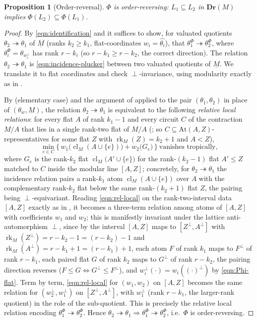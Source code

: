 \documentclass{article}
\newtheorem{proposition}[theorem]{Proposition}
\theoremstyle{definition}
\newcommand{\rk}{\operatorname{rk}}
\newcommand{\cl}{\operatorname{cl}}
\newcommand{\onto}{\twoheadrightarrow}
\newcommand{\Dr}{\mathbf{Dr}}
\begin{document}
\begin{proposition}[Order-reversal]\label{prop:rev}
$\Phi$ is order-reversing: $L_1\subseteq L_2$ in $\Dr(M)$ implies $\Phi(L_2)\subseteq\Phi(L_1)$.
\end{proposition}

\begin{proof}
By \eqref{eqn:identification} and  it suffices to show, for valuated quotients
$\theta_2\onto\theta_1$ of $\underline M$ (ranks $k_2\ge k_1$, flat-coordinates $w_i=\widehat
{\theta_i}$), that $\theta_1^{\Phi}\onto\theta_2^{\Phi}$, where $\theta_i^{\Phi}=\theta_{w_i^{\perp}}$
has rank $r-k_i$ (so $r-k_1\ge r-k_2$, the correct direction). The relation $\theta_2\onto\theta_1$ is
\eqref{eqn:incidence-plucker} between two valuated quotients of $\underline M$. We translate it to
flat coordinates and check $\perp$-invariance, using modularity exactly as in .

By  (elementary case) and the argument of  applied to the pair
$(\theta_1,\theta_2)$ in place of $(\theta_w,\underline M)$, the relation $\theta_2\onto\theta_1$ is
equivalent to the following \emph{relative local relations}: for every flat $A$ of rank $k_1-1$ and
every circuit $C$ of the contraction $M/A$ that lies in a single rank-two flat of $M/A$
(; so $C\subseteq\mathrm{At}(A,Z)$-representatives for some flat $Z$ with
$\rk_M(Z)=k_2+1$ and $A<Z$),
\begin{equation}\label{eqn:rel-local}
  \min_{e\in C}\bigl\{\,w_1\bigl(\cl_M(A\cup\{e\})\bigr)+w_2\bigl(G_e\bigr)\,\bigr\}\ \text{vanishes
  tropically,}
\end{equation}
where $G_e$ is the rank-$k_2$ flat $\cl_M\bigl(A'\cup\{e\}\bigr)$ for the rank-$(k_2-1)$ flat
$A'\le Z$ matched to $C$ inside the modular line $[A,Z]$; concretely, for $\theta_2\onto\theta_1$ the
incidence relation pairs a rank-$k_1$ atom $\cl_M(A\cup\{e\})$ over $A$ with the complementary
rank-$k_2$ flat below the same rank-$(k_2+1)$ flat $Z$, the pairing being $\perp$-equivariant. Reading
\eqref{eqn:rel-local} on the rank-two-interval data $[A,Z]$ exactly as in , it
becomes a three-term relation among atoms of $[A,Z]$ with coefficients $w_1$ and $w_2$; this is
manifestly invariant under the lattice anti-automorphism $\perp$, since by  the
interval $[A,Z]$ maps to $[Z^{\perp},A^{\perp}]$ with $\rk_M(Z^{\perp})=r-k_2-1=(r-k_2)-1$ and
$\rk_M(A^{\perp})=r-k_1+1=(r-k_1)+1$, each atom $F$ of rank $k_1$ maps to $F^{\perp}$ of rank $r-k_1$,
each paired flat $G$ of rank $k_2$ maps to $G^{\perp}$ of rank $r-k_2$, the pairing direction reverses
($F\le G\Leftrightarrow G^{\perp}\le F^{\perp}$), and $w_i^{\perp}(\cdot)=w_i((\cdot)^{\perp})$ by
\eqref{eqn:Phi-flat}. Term by term, \eqref{eqn:rel-local} for $(w_1,w_2)$ on $[A,Z]$ becomes the same
relation for $(w_2^{\perp},w_1^{\perp})$ on $[Z^{\perp},A^{\perp}]$, with $w_1^{\perp}$ (rank $r-k_1$,
the larger-rank quotient) in the role of the sub-quotient. This is precisely the relative local
relation encoding $\theta_1^{\Phi}\onto\theta_2^{\Phi}$. Hence $\theta_2\onto\theta_1\Rightarrow
\theta_1^{\Phi}\onto\theta_2^{\Phi}$, i.e.\ $\Phi$ is order-reversing.
\end{proof}
\end{document}
